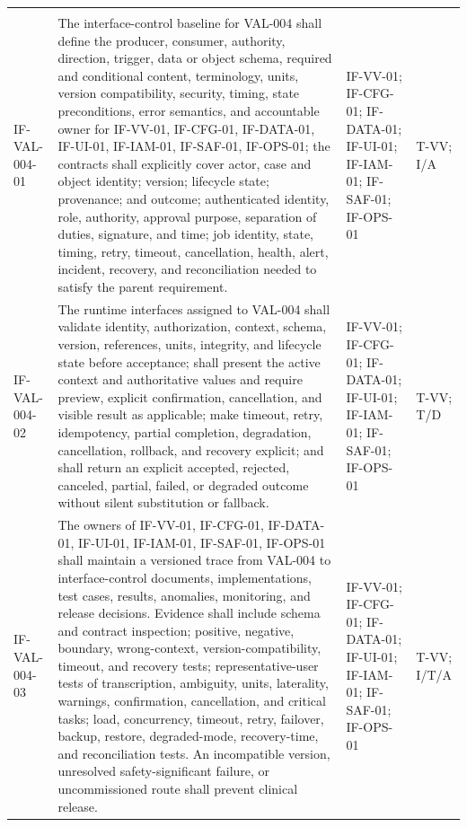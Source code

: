 \documentclass[11pt,letterpaper]{article}
\begin{document}
\begin{scriptsize}
\begin{longtable}{@{}L{0.14\textwidth}L{0.49\textwidth}L{0.19\textwidth}L{0.10\textwidth}@{}}
\addlinespace[2pt]
 \\
\addlinespace[2pt]
\mbox{IF-VAL-004-01} & The interface-control baseline for VAL-004 shall define the producer, consumer, authority, direction, trigger, data or object schema, required and conditional content, terminology, units, version compatibility, security, timing, state preconditions, error semantics, and accountable owner for IF-VV-01, IF-CFG-01, IF-DATA-01, IF-UI-01, IF-IAM-01, IF-SAF-01, IF-OPS-01; the contracts shall explicitly cover actor, case and object identity; version; lifecycle state; provenance; and outcome; authenticated identity, role, authority, approval purpose, separation of duties, signature, and time; job identity, state, timing, retry, timeout, cancellation, health, alert, incident, recovery, and reconciliation needed to satisfy the parent requirement. & IF-VV-01; IF-CFG-01; IF-DATA-01; IF-UI-01; IF-IAM-01; IF-SAF-01; IF-OPS-01 & T-VV; I\slash\allowbreak{}A \\
\addlinespace[2pt]
\mbox{IF-VAL-004-02} & The runtime interfaces assigned to VAL-004 shall validate identity, authorization, context, schema, version, references, units, integrity, and lifecycle state before acceptance; shall present the active context and authoritative values and require preview, explicit confirmation, cancellation, and visible result as applicable; make timeout, retry, idempotency, partial completion, degradation, cancellation, rollback, and recovery explicit; and shall return an explicit accepted, rejected, canceled, partial, failed, or degraded outcome without silent substitution or fallback. & IF-VV-01; IF-CFG-01; IF-DATA-01; IF-UI-01; IF-IAM-01; IF-SAF-01; IF-OPS-01 & T-VV; T\slash\allowbreak{}D \\
\addlinespace[2pt]
\mbox{IF-VAL-004-03} & The owners of IF-VV-01, IF-CFG-01, IF-DATA-01, IF-UI-01, IF-IAM-01, IF-SAF-01, IF-OPS-01 shall maintain a versioned trace from VAL-004 to interface-control documents, implementations, test cases, results, anomalies, monitoring, and release decisions. Evidence shall include schema and contract inspection; positive, negative, boundary, wrong-context, version-compatibility, timeout, and recovery tests; representative-user tests of transcription, ambiguity, units, laterality, warnings, confirmation, cancellation, and critical tasks; load, concurrency, timeout, retry, failover, backup, restore, degraded-mode, recovery-time, and reconciliation tests. An incompatible version, unresolved safety-significant failure, or uncommissioned route shall prevent clinical release. & IF-VV-01; IF-CFG-01; IF-DATA-01; IF-UI-01; IF-IAM-01; IF-SAF-01; IF-OPS-01 & T-VV; I\slash\allowbreak{}T\slash\allowbreak{}A \\

\end{longtable}
\end{scriptsize}
\end{document}
